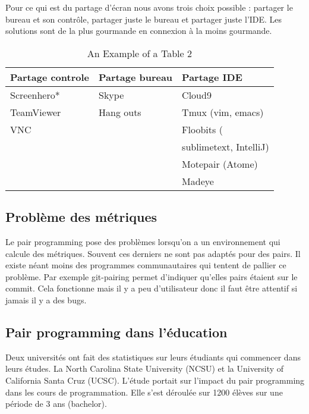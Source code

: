 \documentclass[journal, a4paper, frenchb]{IEEEtran}
\begin{document}
Pour ce qui est du partage d’écran nous avons trois choix possible : partager le bureau et son
contrôle, partager juste le bureau et partager juste l’IDE. Les solutions sont de la plus gourmande en
connexion à la moins gourmande.

\begin{table*}[!t]
\begin{center}
    \caption{An Example of a Table 2}
    \label{table_example_2}
    \begin{tabular}{| l | l | l|}
    \hline
    Partage controle & Partage bureau & Partage IDE  \\ \hline
    Screenhero* & Skype & Cloud9 \\
    TeamViewer & Hang outs & Tmux (vim, emacs) \\ 
    VNC &  & Floobits ( \\
     & &  \hspace{1mm}  sublimetext, IntelliJ)\\
     & & Motepair (Atome) \\
     & & Madeye \\
    \hline
    \end{tabular}
\end{center}
\end{table*}

\subsection{Problème des métriques}

Le pair programming pose des problèmes lorsqu’on a un environnement qui calcule des métriques.
Souvent ces derniers ne sont pas adaptés pour des pairs. Il existe néant moins des programmes
communautaires qui tentent de pallier ce problème. Par exemple git-pairing permet d’indiquer
qu’elles pairs étaient sur le commit. Cela fonctionne mais il y a peu d’utilisateur donc il faut être
attentif si jamais il y a des bugs.

\subsection{Pair programming dans l’éducation}


Deux universités ont fait des statistiques sur leurs étudiants qui commencer dans leurs études. La
North Carolina State University (NCSU) et la University of California Santa Cruz (UCSC). L’étude
portait sur l’impact du pair programming dans les cours de programmation. Elle s’est déroulée sur
1200 élèves sur une période de 3 ans (bachelor).
\end{document}
